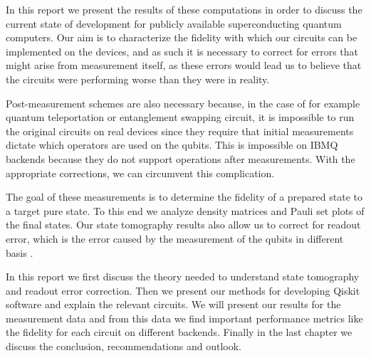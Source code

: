 In this report we present the results of these computations in order to discuss
the current state of development for publicly available superconducting quantum
computers. Our aim is to characterize the fidelity with which our circuits can
be implemented on the devices, and as such it is necessary to correct for errors
that might arise from measurement itself, as these errors would lead us to
believe that the circuits were performing worse than they were in reality.

Post-measurement schemes are also necessary because, in the case of for example
quantum teleportation or entanglement swapping circuit, it is impossible to run
the original circuits on real devices since they require that initial
measurements dictate which operators are used on the qubits. This is impossible
on IBMQ backends because they do not support operations after measurements. With
the appropriate corrections, we can circumvent this complication.

The goal of these measurements is to determine the fidelity of a prepared state
to a target pure state. To this end we analyze density matrices and Pauli set
plots of the final states. Our state tomography results also allow us to correct
for readout error, which is the error caused by the measurement of the qubits in
different basis \cite{nielsen10_quant}.

In this report we first discuss the theory needed to understand state tomography
and readout error correction. Then we present our methods for developing Qiskit
software and explain the relevant circuits. We will present our results for the
measurement data and from this data we find important performance metrics like
the fidelity for each circuit on different backends. Finally in the last chapter
we discuss the conclusion, recommendations and outlook.

